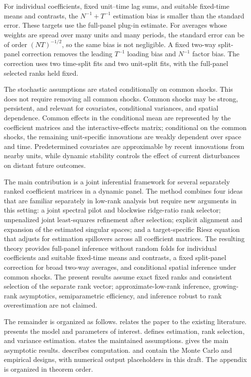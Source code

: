 \documentclass[11pt]{article}
\numberwithin{equation}{section}
\theoremstyle{remark}
\begin{document}
For individual coefficients, fixed unit--time lag sums, and suitable fixed-time means and contrasts, the $N^{-1}+T^{-1}$ estimation bias is smaller than the standard error. These targets use the full-panel plug-in estimate. For averages whose weights are spread over many units and many periods, the standard error can be of order $(NT)^{-1/2}$, so the same bias is not negligible. A fixed two-way split-panel correction removes the leading $T^{-1}$ loading bias and $N^{-1}$ factor bias. The correction uses two time-split fits and two unit-split fits, with the full-panel selected ranks held fixed.

The stochastic assumptions are stated conditionally on common shocks. This does not require removing all common shocks. Common shocks may be strong, persistent, and relevant for covariates, conditional variances, and spatial dependence. Common effects in the conditional mean are represented by the coefficient matrices and the interactive-effects matrix; conditional on the common shocks, the remaining unit-specific innovations are weakly dependent over space and time. Predetermined covariates are approximable by recent innovations from nearby units, while dynamic stability controls the effect of current disturbances on distant future outcomes.

The main contribution is a joint inferential framework for several separately ranked coefficient matrices in a dynamic panel. The method combines four ideas that are familiar separately in low-rank analysis but require new arguments in this setting: a joint spectral pilot and blockwise ridge-ratio rank selector; unpenalized joint least-squares refinement after selection; explicit alignment and expansion of the estimated singular spaces; and a target-specific Riesz equation that adjusts for estimation spillovers across all coefficient matrices. The resulting theory provides full-panel inference without random folds for individual coefficients and suitable fixed-time means and contrasts, a fixed split-panel correction for broad two-way averages, and conditional spatial inference under common shocks. The present results assume exact fixed ranks and consistent selection of the separate rank vector; approximate-low-rank inference, growing-rank asymptotics, semiparametric efficiency, and inference robust to rank overestimation are not claimed.

The remainder is organized as follows.  relates the paper to the existing literature.  presents the model and parameters of interest.  defines estimation, rank selection, and variance estimation.  states the maintained assumptions.  gives the main asymptotic results.  describes computation.  and  contain the Monte Carlo and empirical designs, with numerical output placeholders in this draft. The appendix is organized in theorem order.
\end{document}
